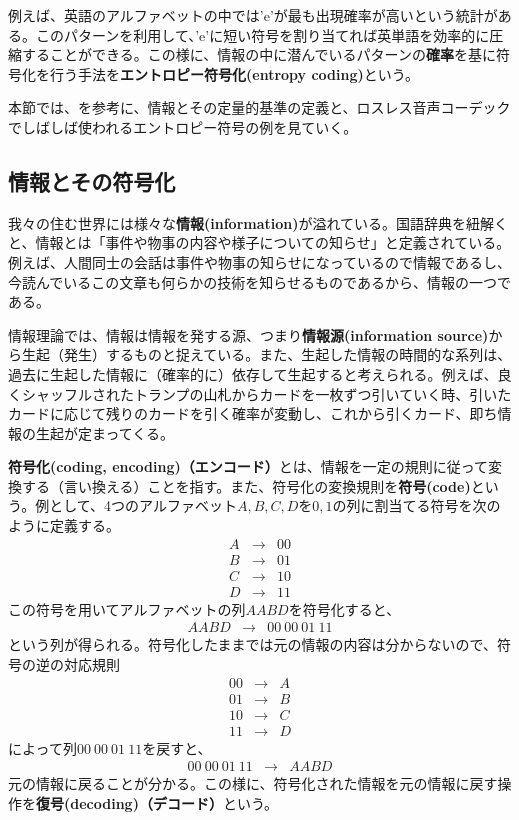 \documentclass[uplatex,dvipdfmx,b5j,10pt]{jsbook}
\theoremstyle{definition}
\begin{document}
例えば、英語のアルファベットの中では'e'が最も出現確率が高いという統計\cite{alphabethist}がある。このパターンを利用して、'e'に短い符号を割り当てれば英単語を効率的に圧縮することができる。この様に、情報の中に潜んでいるパターンの\textbf{確率}を基に符号化を行う手法を\textbf{エントロピー符号化(entropy coding)}という。

本節では、\cite{amariinfo,miyagawainfo}を参考に、情報とその定量的基準の定義と、ロスレス音声コーデックでしばしば使われるエントロピー符号の例を見ていく。

\subsection{情報とその符号化\label{information_and_coding}}

我々の住む世界には様々な\textbf{情報(information)}が溢れている。国語辞典\cite{kokugojiten}を紐解くと、情報とは「事件や物事の内容や様子についての知らせ」と定義されている。例えば、人間同士の会話は事件や物事の知らせになっているので情報であるし、今読んでいるこの文章も何らかの技術を知らせるものであるから、情報の一つである。

情報理論では、情報は情報を発する源、つまり\textbf{情報源(information source)}から生起（発生）するものと捉えている。また、生起した情報の時間的な系列は、過去に生起した情報に（確率的に）依存して生起すると考えられる。例えば、良くシャッフルされたトランプの山札からカードを一枚ずつ引いていく時、引いたカードに応じて残りのカードを引く確率が変動し、これから引くカード、即ち情報の生起が定まってくる。

\textbf{符号化(coding, encoding)（エンコード）}とは、情報を一定の規則に従って変換する（言い換える）ことを指す。また、符号化の変換規則を\textbf{符号(code)}という。例として、4つのアルファベット$A, B, C, D$を$0,1$の列に割当てる符号を次のように定義する。
\begin{eqnarray*}
  A &\rightarrow& 00 \\
  B &\rightarrow& 01 \\
  C &\rightarrow& 10 \\
  D &\rightarrow& 11
\end{eqnarray*}
この符号を用いてアルファベットの列$AABD$を符号化すると、
\begin{eqnarray*}
  AABD &\rightarrow& 00\ 00\ 01\ 11
\end{eqnarray*}
という列が得られる。符号化したままでは元の情報の内容は分からないので、符号の逆の対応規則
\begin{eqnarray*}
  00 &\rightarrow& A \\
  01 &\rightarrow& B \\
  10 &\rightarrow& C \\
  11 &\rightarrow& D
\end{eqnarray*}
によって列$00\ 00\ 01\ 11$を戻すと、
\begin{eqnarray*}
  00\ 00\ 01\ 11 &\rightarrow& AABD
\end{eqnarray*}
元の情報に戻ることが分かる。この様に、符号化された情報を元の情報に戻す操作を\textbf{復号(decoding)（デコード）}という。
\end{document}
